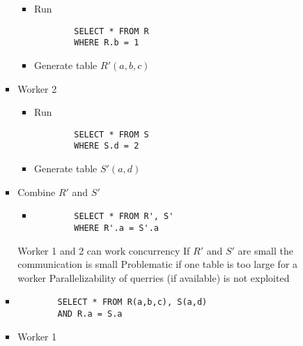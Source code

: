 \begin{itemize}
\begin{itemize}
\begin{itemize}
\begin{itemize}
                                \begin{itemize}
                                    \item Run
        \begin{verbatim}
        SELECT * FROM R
        WHERE R.b = 1
        \end{verbatim}
                                    \item Generate table $R'(a, b, c)$
                                \end{itemize}
                            \item Worker 2
                                \begin{itemize}
                                    \item Run
        \begin{verbatim}
        SELECT * FROM S
        WHERE S.d = 2
        \end{verbatim}
                                    \item Generate table $S'(a, d)$
                                \end{itemize}
                            \item Combine $R'$ and $S'$
                                \begin{itemize}
                                    \item
        \begin{verbatim}
        SELECT * FROM R', S'
        WHERE R'.a = S'.a
        \end{verbatim}
                                \end{itemize}
                            \ipro Worker 1 and 2 can work concurrency
                            \ipro If $R'$ and $S'$ are small the communication is small
                            \icon Problematic if one table is too large for a worker
                            \ipro Parallelizability of querries (if available) is not exploited
                        \end{itemize}
                        \begin{itemize}
                            \item 
        \begin{verbatim}
        SELECT * FROM R(a,b,c), S(a,d)
        AND R.a = S.a
        \end{verbatim}
                            \item Worker 1

\end{itemize}
\end{itemize}
\end{itemize}
\end{itemize}
